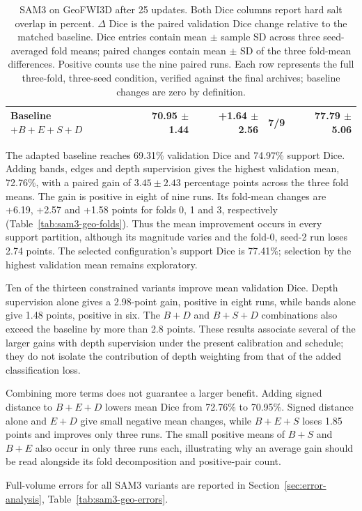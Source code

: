 \documentclass[12pt,a4paper]{article}
\begin{document}
\begin{table}[htbp]
\begin{tabular}{@{}lrrrr@{}}
Baseline $+B+E+S+D$ & 70.95 $\pm$ 1.44 & +1.64 $\pm$ 2.56 & 7/9 & 77.79 $\pm$ 5.06 \\
\hline
\end{tabular}
\caption{SAM3 on GeoFWI3D after 25 updates. Both Dice columns report
hard salt overlap in percent. $\Delta$ Dice is the paired validation
Dice change relative to the matched baseline. Dice entries contain mean
$\pm$ sample SD across three seed-averaged fold means; paired changes
contain mean $\pm$ SD of the three fold-mean differences. Positive counts
use the nine paired runs. Each row represents the full three-fold,
three-seed condition, verified against the final archives;
baseline changes are zero by definition.}
\label{tab:sam3-geo-results}
\end{table}

The adapted baseline reaches 69.31\% validation Dice and 74.97\%
support Dice. Adding bands, edges and depth supervision gives the
highest validation mean, 72.76\%, with a paired gain of
$3.45\pm2.43$ percentage points across the three fold means.
The gain is positive in eight of nine runs. Its fold-mean changes are
+6.19, +2.57 and +1.58 points for folds 0, 1 and 3, respectively
(Table~\ref{tab:sam3-geo-folds}). Thus the mean improvement occurs
in every support partition, although its magnitude varies and the
fold-0, seed-2 run loses 2.74 points. The selected configuration's
support Dice is 77.41\%; selection by the highest validation mean
remains exploratory.

Ten of the thirteen constrained variants improve mean validation Dice.
Depth supervision alone gives a 2.98-point gain, positive in eight
runs, while bands alone give 1.48 points, positive in six. The
$B+D$ and $B+S+D$ combinations also exceed the baseline by more
than 2.8 points. These results associate several of the larger gains
with depth supervision under the present calibration and schedule;
they do not isolate the contribution of depth weighting from that
of the added classification loss.

Combining more terms does not guarantee a larger benefit. Adding
signed distance to $B+E+D$ lowers mean Dice from 72.76\% to
70.95\%. Signed distance alone and $E+D$ give small negative
mean changes, while $B+E+S$ loses 1.85 points and improves only
three runs. The small positive means of $B+S$ and $B+E$ also
occur in only three runs each, illustrating why an average gain
should be read alongside its fold decomposition and positive-pair count.

Full-volume errors for all SAM3 variants are reported in
Section~\ref{sec:error-analysis}, Table~\ref{tab:sam3-geo-errors}.
\end{document}
